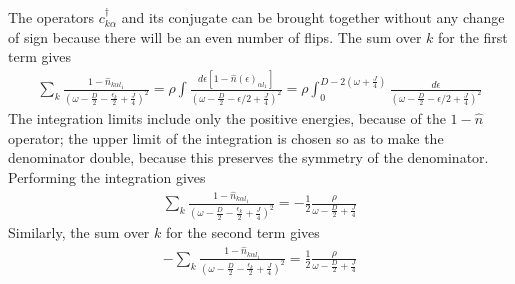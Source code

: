 \documentclass[12pt]{revtex4-2}
\begin{document}
The operators \(c^\dagger_{k\alpha}\) and its conjugate can be brought together without any change of sign because there will be an even number of flips. The sum over \(k\) for the first term gives
\begin{align}
	\sum_k \frac{1 - \hat n_{k\alpha l_1}}{\left(\omega - \frac{D}{2} - \frac{\epsilon_k}{2} + \frac{J}{4}\right)^2} =  \rho\int \frac{d\epsilon\left[1 - \hat n(\epsilon)_{\alpha l_1}\right] }{\left(\omega - \frac{D}{2} -\epsilon/2 + \frac{J}{4}\right)^2} = \rho\int_0^{D-2\left( \omega + \frac{J}{4} \right) } \frac{d\epsilon}{\left(\omega - \frac{D}{2} -\epsilon/2 + \frac{J}{4}\right)^2}
\end{align}
The integration limits include only the positive energies, because of the \(1 - \hat n\) operator; the upper limit of the integration is chosen so as to make the denominator double, because this preserves the symmetry of the denominator. Performing the integration gives
\begin{align}
	\sum_k \frac{1 - \hat n_{k\alpha l_1}}{\left(\omega - \frac{D}{2} - \frac{\epsilon_k}{2} + \frac{J}{4}\right)^2} = -\frac{1}{2}\frac{\rho}{\omega - \frac{D}{2} + \frac{J}{4}}
\end{align}
Similarly, the sum over \(k\) for the second term gives
\begin{align}
	\label{term2_sum}
	-\sum_k \frac{1 - \hat n_{k\alpha l_1}}{\left(\omega - \frac{D}{2} - \frac{\epsilon_k}{2} + \frac{J}{4}\right)^2} = \frac{1}{2}\frac{\rho}{\omega - \frac{D}{2} + \frac{J}{4}}
\end{align}
\end{document}
